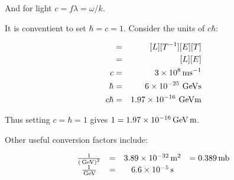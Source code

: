 And for light $c = f\lambda = \omega / k$.

It is conventient to set $\hbar = c = 1$.  Consider the units of $c\hbar$:

\begin{eqnarray*}
  [c\hbar] & = & [L] [T^{-1}] [E] [T] \\
  & = & [L] [E] \\
  c & = & 3 \times 10^8 \units{ms}^{-1} \\
  \hbar & = & 6 \times 10^{-25} \units{\gev s} \\
  c \hbar & = & 1.97 \times 10^{-16} \units{\gev m}
\end{eqnarray*}

Thus setting $c = \hbar = 1$ gives $1 = 1.97 \times 10^{-16} \mathrm{\,GeV}\mathrm{\,m}$.

Other useful conversion factors include:

\[
  \begin{array}{cccl}
  \frac{1}{\left( \mathrm{\,GeV} \right)^2} & = & 3.89 \times 10^{-32}\mathrm{\,m}^2 & = 0.389 \mathrm{\,mb} \\
  \frac{1}{\mathrm{\,GeV}} & = & 6.6 \times 10^{-5} \mathrm{\,s} & 
  \end{array}
\]
